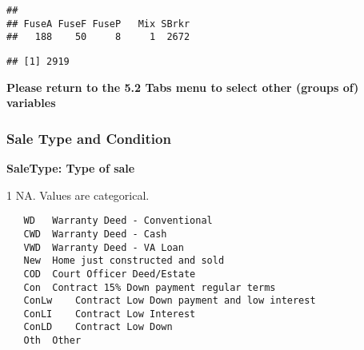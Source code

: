 \documentclass[]{article}
\newenvironment{Shaded}{\begin{snugshade}}{\end{snugshade}}
\newcommand{\KeywordTok}[1]{\textcolor[rgb]{0.13,0.29,0.53}{\textbf{#1}}}
\newcommand{\DecValTok}[1]{\textcolor[rgb]{0.00,0.00,0.81}{#1}}
\newcommand{\StringTok}[1]{\textcolor[rgb]{0.31,0.60,0.02}{#1}}
\newcommand{\CommentTok}[1]{\textcolor[rgb]{0.56,0.35,0.01}{\textit{#1}}}
\newcommand{\OperatorTok}[1]{\textcolor[rgb]{0.81,0.36,0.00}{\textbf{#1}}}
\newcommand{\NormalTok}[1]{#1}
\begin{document}
\begin{verbatim}
## 
## FuseA FuseF FuseP   Mix SBrkr 
##   188    50     8     1  2672
\end{verbatim}

\begin{Shaded}
\end{Shaded}

\begin{verbatim}
## [1] 2919
\end{verbatim}

\textbf{Please return to the 5.2 Tabs menu to select other (groups of)
variables}

\subsubsection{Sale Type and Condition}\label{sale-type-and-condition}

\textbf{SaleType: Type of sale}

1 NA. Values are categorical.

\begin{verbatim}
   WD   Warranty Deed - Conventional
   CWD  Warranty Deed - Cash
   VWD  Warranty Deed - VA Loan
   New  Home just constructed and sold
   COD  Court Officer Deed/Estate
   Con  Contract 15% Down payment regular terms
   ConLw    Contract Low Down payment and low interest
   ConLI    Contract Low Interest
   ConLD    Contract Low Down
   Oth  Other
\end{verbatim}

\begin{Shaded}
\end{Shaded}
\end{document}
